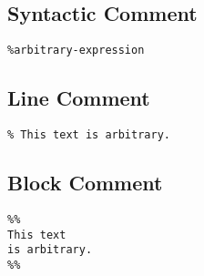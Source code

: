 \documentclass{article}
\begin{document}
\begin{multicols}
\bigskip\subsection*{Syntactic Comment}
\begin{lstlisting}
%arbitrary-expression
\end{lstlisting}

\bigskip\subsection*{Line Comment}
\begin{lstlisting}
% This text is arbitrary.
\end{lstlisting}

\bigskip\subsection*{Block Comment}
\begin{lstlisting}
%%
This text
is arbitrary.
%%
\end{lstlisting}

\end{multicols}
\end{document}
